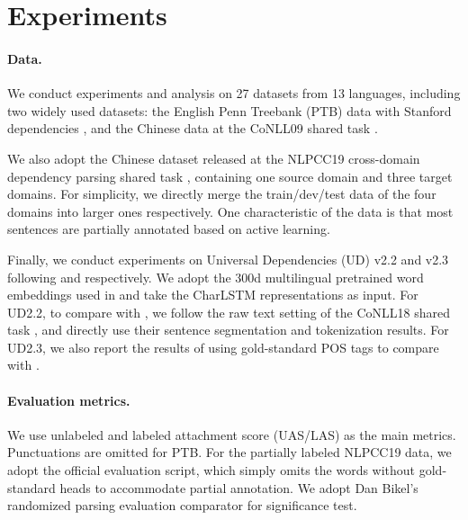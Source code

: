 \documentclass[11pt,a4paper]{article}
\begin{document}
 










\section{Experiments}
\label{section:experiments-analysis}



\paragraph{Data.}
We conduct experiments and analysis on 27 datasets from 13 languages,
including two widely used datasets:
the English Penn Treebank (PTB) data with Stanford dependencies \cite{chen-manning-2014-fast}, and the Chinese data at the CoNLL09 shared task \cite{hajic-etal-2009-conll}.

We also adopt the Chinese dataset released at the NLPCC19 cross-domain dependency parsing shared task \cite{peng2019overview},
containing one source domain and three target domains.
For simplicity,
we directly merge the train/dev/test data of the four domains into larger ones respectively.
One characteristic of the data is that most sentences are partially annotated based on active learning.


Finally, we conduct experiments on Universal Dependencies (UD) v2.2 and v2.3
following \citet{ji-etal-2019-graph} and \citet{zhang-etal-2019-empirical} respectively.
We adopt the 300d multilingual pretrained word embeddings used in \citet{zeman-etal-2018-conll} and take the CharLSTM representations as input.
For UD2.2, to compare with \citet{ji-etal-2019-graph}, we follow the raw text setting of the CoNLL18 shared task \cite{zeman-etal-2018-conll}, and directly use their sentence segmentation and tokenization results.
For UD2.3, we also report the results of using gold-standard POS tags to compare with \citet{zhang-etal-2019-empirical}.









\paragraph{Evaluation metrics.}
We use unlabeled and labeled attachment score (UAS/LAS) as the main metrics.
Punctuations are omitted for PTB.
For the partially labeled NLPCC19 data, we adopt the official evaluation script, which simply omits the words without gold-standard heads to accommodate partial annotation.
We adopt Dan Bikel’s randomized parsing evaluation comparator for significance
test.
\end{document}
